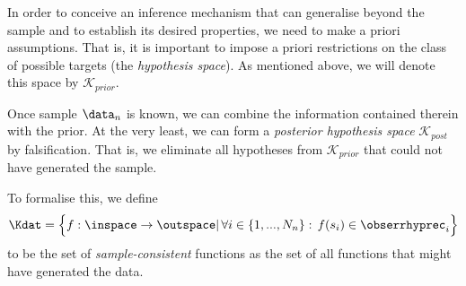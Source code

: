 In order to conceive an inference mechanism that can generalise beyond the sample and to establish its desired properties, we need to make a priori assumptions.
That is, it is important to impose a priori restrictions on the class of possible targets (the \textit{hypothesis space}). As mentioned above, we will denote this space by $\mathcal K_{prior}$.



%
%


Once sample $\data_n$ is known, we can combine the information contained therein with the prior. At the very least, we can form a \textit{posterior hypothesis space} $\mathcal K_{post}$ by falsification. That is, we eliminate all hypotheses from $\mathcal K_{prior}$ that could not have generated the sample. 

To formalise this, we define 
\begin{equation}
	\Kdat = \Bigl\{ f: \inspace \to \outspace | \, \forall i \in \{1,...,N_n\}: \, f(s_i) \in \obserrhyprec_i  \Bigr\}
\end{equation}
to be the set of \textit{sample-consistent} functions as the set of all functions that might have generated the data.


